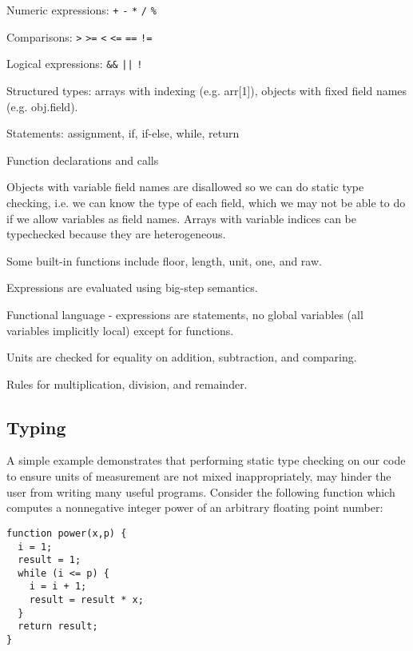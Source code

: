 \documentclass{acm_proc_article-sp}
\begin{document}
Numeric expressions: \verb#+# \verb#-# \verb#*# \verb#/# \verb#%#

Comparisons: \verb#># \verb#>=# \verb#<# \verb#<=# \verb#==# \verb#!=#

Logical expressions: \verb#&&# \verb#||# \verb#!#

Structured types: arrays with indexing (e.g. arr[1]), objects with
fixed field names (e.g. obj.field).

Statements: assignment, if, if-else, while, return

Function declarations and calls

Objects with variable field names are disallowed so we can do static
type checking, i.e. we can know the type of each field, which we may
not be able to do if we allow variables as field names. Arrays with
variable indices can be typechecked because they are heterogeneous.

Some built-in functions include floor, length, unit, one, and raw.

Expressions are evaluated using big-step semantics.

Functional language - expressions are statements, no global variables
(all variables implicitly local) except for functions.

Units are checked for equality on addition, subtraction, and comparing.

Rules for multiplication, division, and remainder.

\subsection{Typing}
A simple example demonstrates that performing static type checking on
our code to ensure units of measurement are not mixed inappropriately,
may hinder the user from writing many useful programs. Consider the
following function which computes a nonnegative integer power of an
arbitrary floating point number:

\verb#function power(x,p) {# \\
\verb#  i = 1;# \\
\verb#  result = 1;# \\
\verb#  while (i <= p) {# \\
\verb#    i = i + 1;# \\
\verb#    result = result * x;# \\
\verb#  }# \\
\verb#  return result;# \\
\verb#}#
\vspace{0.125in}
\end{document}
